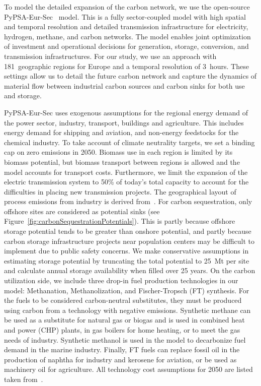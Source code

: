 To model the detailed expansion of the carbon network, we use the open-source PyPSA-Eur-Sec~\cite{PyPSAEurSecSectorCoupledOpen2023} model. This is a fully sector-coupled model with high spatial and temporal resolution and detailed transmission infrastructure for electricity, hydrogen, methane, and carbon networks. The model enables joint optimization of investment and operational decisions for generation, storage, conversion, and transmission infrastructures. For our study, we use an approach with 181~geographic regions for Europe and a temporal resolution of 3~hours. These settings allow us to detail the future carbon network and capture the dynamics of material flow between industrial carbon sources and carbon sinks for both use and storage.

PyPSA-Eur-Sec uses exogenous assumptions for the regional energy demand of the power sector, industry, transport, buildings and agriculture. This includes energy demand for shipping and aviation, and non-energy feedstocks for the chemical industry. To take account of climate neutrality targets, we set a binding cap on zero emissions in 2050. Biomass use in each region is limited by its biomass potential, but biomass transport between regions is allowed and the model accounts for transport costs. Furthermore, we limit the expansion of the electric transmission system to 50\% of today's total capacity to account for the difficulties in placing new transmission projects. The geographical layout of process emissions from industry is derived from~\cite{piamanzGeoreferencedIndustrialSites2018}. For carbon sequestration, only offshore sites are considered as potential sinks (see Figure~\ref{fig:carbonSequestrationPotentials}). This is partly because offshore storage potential tends to be greater than onshore potential, and partly because carbon storage infrastructure projects near population centers may be difficult to implement due to public safety concerns. We make conservative assumptions in estimating storage potential by truncating the total potential to 25~Mt per site and calculate annual storage availability when filled over 25 years.
On the carbon utilization side, we include three drop-in fuel production technologies in our model: Methanation, Methanolization, and Fischer-Tropsch (FT) synthesis. For the fuels to be considered carbon-neutral substitutes, they must be produced using carbon from a technology with negative emissions. Synthetic methane can be used as a substitute for natural gas or biogas and is used in combined heat and power (CHP) plants, in gas boilers for home heating, or to meet the gas needs of industry. Synthetic methanol is used in the model to decarbonize fuel demand in the marine industry. Finally, FT fuels can replace fossil oil in the production of naphtha for industry and kerosene for aviation, or be used as machinery oil for agriculture.
All technology cost assumptions for 2050 are listed taken from~\cite{lisazeyenPyPSATechnologydataTechnology2023}.

